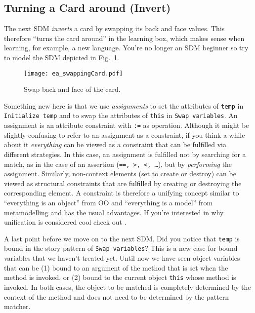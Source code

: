 \subsection{Turning a Card around (Invert)}

The next SDM \emph{inverts} a card by swapping its back and face values. This therefore ``turns the card around'' in the learning box, which makes sense when
learning, for example, a new language. You're no longer an SDM beginner so try to model the SDM depicted in Fig.~\ref{fig:sdm_invert}.

\begin{figure}[htbp]
\begin{center}
  \texttt{[image: ea\_swappingCard.pdf]}
  \caption{Swap back and face of the card.}  
  \label{fig:sdm_invert}
\end{center}
\end{figure}

Something new here is that we use \emph{assignments} to set the attributes of \texttt{temp} in \texttt{Initialize temp} and to swap the
attributes of \texttt{this} in \texttt{Swap variables}. An assignment is an attribute constraint with \texttt{:=} as operation.  Although it might be slightly
confusing to refer to an assignment as a constraint, if you think a while about it \emph{everything} can be viewed as a constraint that can be fulfilled via
different strategies. In this case, an assignment is fulfilled not by searching  for a match, as in the case of an assertion (\texttt{==, >, <,
\ldots}), but by \emph{performing} the assignment. Similarly, non-context elements (set to create or destroy) can be viewed as structural constraints that are
fulfilled by creating or destroying the corresponding element.  A constraint is therefore a unifying concept similar to ``everything is an object'' from OO and
``everything is a model'' from metamodelling and has the usual advantages.  If  you're interested in why unification is considered cool check
out \cite{BEZ05}.

A last point before we move on to the next SDM.  Did you notice that \texttt{temp} is bound in the story pattern of \texttt{Swap variables}?  This is a new case
for bound variables that we haven't treated yet. Until now we have seen object variables that can be (1) bound to an argument of the method that is set when the
method is invoked, or (2) bound to the current object \texttt{this} whose method is invoked. In both cases, the object to be matched is completely determined by
the context of the method and does not need to be determined by the pattern matcher.


